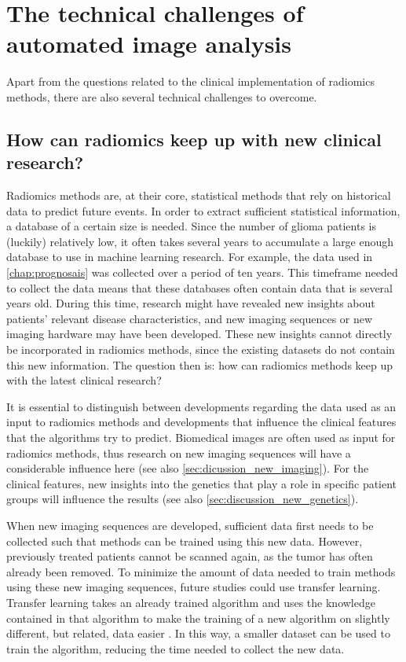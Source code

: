 \section{The technical challenges of automated image analysis}\label{sec:discussion_technical}

Apart from the questions related to the clinical implementation of radiomics methods, there are also several technical challenges to overcome.

\subsection{How can radiomics keep up with new clinical research?}\label{subsec:discussion_new_research}

Radiomics methods are, at their core, statistical methods that rely on historical data to predict future events.
In order to extract sufficient statistical information, a database of a certain size is needed.
Since the number of glioma patients is (luckily) relatively low, it often takes several years to accumulate a large enough database to use in machine learning research.
For example, the data used in \cref{chap:prognosais} was collected over a period of ten years.
This timeframe needed to collect the data means that these databases often contain data that is several years old.
During this time, research might have revealed new insights about patients' relevant disease characteristics, and new imaging sequences or new imaging hardware may have been developed.
These new insights cannot directly be incorporated in radiomics methods, since the existing datasets do not contain this new information.
The question then is: how can radiomics methods keep up with the latest clinical research?

It is essential to distinguish between developments regarding the data used as an input to radiomics methods and developments that influence the clinical features that the algorithms try to predict.
Biomedical images are often used as input for radiomics methods, thus research on new imaging sequences will have a considerable influence here (see also \cref{sec:dicussion_new_imaging}).
For the clinical features, new insights into the genetics that play a role in specific patient groups will influence the results (see also \cref{sec:discussion_new_genetics}).

When new imaging sequences are developed, sufficient data first needs to be collected such that methods can be trained using this new data.
However, previously treated patients cannot be scanned again, as the \gls{tumor} has often already been removed.
To minimize the amount of data needed to train methods using these new imaging sequences, future studies could use transfer learning.
Transfer learning takes an already trained algorithm and uses the knowledge contained in that algorithm to make the training of a new algorithm on slightly different, but related, data easier \autocite{shin2016deep}.
In this way, a smaller dataset can be used to train the algorithm, reducing the time needed to collect the new data.

